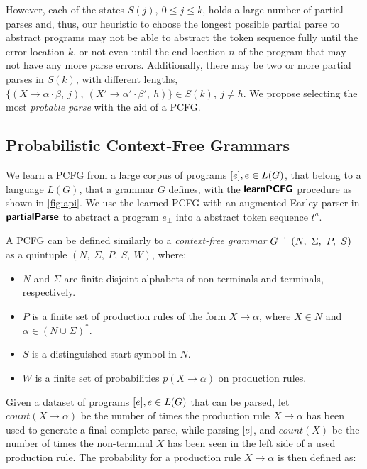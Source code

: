 %
However, each of the states $S(j),\ 0 \leq j \leq k$, holds a large number of
partial parses and, thus, our heuristic to choose the longest possible partial
parse to abstract programs may not be able to abstract the token sequence fully
until the error location $k$, or not even until the end location $n$ of the
program that may not have any more parse errors. Additionally, there may be two
or more partial parses in $S(k)$, with different lengths, \eg $\{(X \rightarrow
\alpha \cdot \beta,\ j),\ (X' \rightarrow \alpha' \cdot \beta',\ h)\} \in S(k),\
j \neq h$. We propose selecting the most \emph{probable parse} with the aid of a
PCFG.


\subsection{Probabilistic Context-Free Grammars}
\label{sec:prog-abstract:pcfg}
We learn a PCFG from a large corpus of programs $[e], e \in L(G)$, that
belong to a language $L(G)$, that a grammar $G$ defines, with the
$\bm{\mathsf{learnPCFG}}$ procedure as shown in \autoref{fig:api}. We use the learned PCFG
with an augmented Earley parser in $\bm{\mathsf{partialParse}}$ to abstract a program
$e_{\bot}$ into a abstract token sequence $t^a$.

%
A PCFG can be defined similarly to a \emph{context-free grammar} $G \doteq (N,\
\Sigma,\ P,\ S)$ as a quintuple $(N,\ \Sigma,\ P,\ S,\ W)$, where:
\begin{itemize}
    \item $N$ and $\Sigma$ are finite disjoint alphabets of non-terminals and
    terminals, respectively.
    \item $P$ is a finite set of production rules of the form $X \rightarrow
    \alpha$, where $X \in N$ and $\alpha \in (N \cup \Sigma)^{\ast}$.
    \item $S$ is a distinguished start symbol in $N$.
    \item $W$ is a finite set of probabilities $p(X \rightarrow \alpha)$ on
    production rules.
\end{itemize}

Given a dataset of programs $[e], e \in L(G)$ that can be parsed, let
$count(X \rightarrow \alpha)$ be the number of times the production rule $X
\rightarrow \alpha$ has been used to generate a final complete parse, while
parsing $[e]$, and $count(X)$ be the number of times the non-terminal $X$
has been seen in the left side of a used production rule. The probability for a
production rule $X \rightarrow \alpha$ is then defined as:

